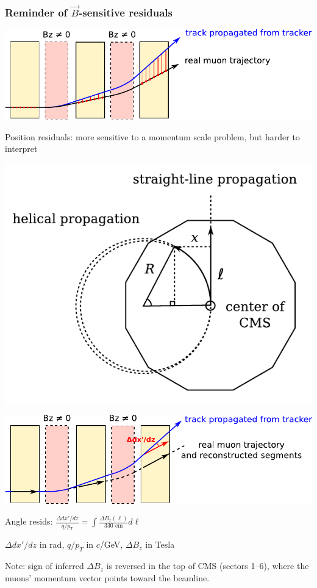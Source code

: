 \documentclass[compress]{beamer}
\begin{document}
\begin{frame}
\frametitle{Reminder of $\vec{B}$-sensitive residuals}

\includegraphics[width=0.75\linewidth]{paths.pdf}

\vspace{-0.75 cm}
\hfill \begin{minipage}{0.55\linewidth}
Position residuals: more sensitive to a momentum scale problem, but harder to interpret
\end{minipage}

\hfill \includegraphics[width=0.3\linewidth]{bfield_derivation.png}

\vspace{-1.5 cm}
\includegraphics[width=0.75\linewidth]{paths2.pdf}

\vspace{-0.75 cm}
\hfill \begin{minipage}{0.55\linewidth}
Angle resids: $\displaystyle \frac{\Delta dx'/dz}{q/p_T} = \int \frac{\Delta B_z(\ell)}{\mbox{330~cm}} d\ell$

\vspace{0.2 cm}
{\scriptsize $\Delta dx'/dz$ in rad, $q/p_T$ in $c$/GeV, $\Delta B_z$ in Tesla}
\end{minipage}

\vspace{0.5 cm} Note: sign of inferred $\Delta B_z$ is reversed in the
top of CMS (sectors 1--6), where the muons' momentum vector points
toward the beamline.
\end{frame}
\end{document}
